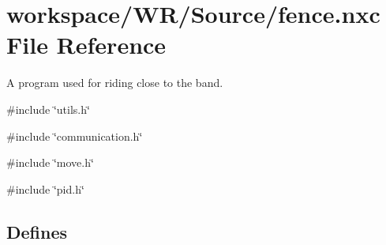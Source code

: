 \hypertarget{fence_8nxc}{
\section{workspace/WR/Source/fence.nxc File Reference}
\label{fence_8nxc}
}


A program used for riding close to the band.  


{\ttfamily \#include \char`\"{}utils.h\char`\"{}}\par
{\ttfamily \#include \char`\"{}communication.h\char`\"{}}\par
{\ttfamily \#include \char`\"{}move.h\char`\"{}}\par
{\ttfamily \#include \char`\"{}pid.h\char`\"{}}\par
\subsection*{Defines}

